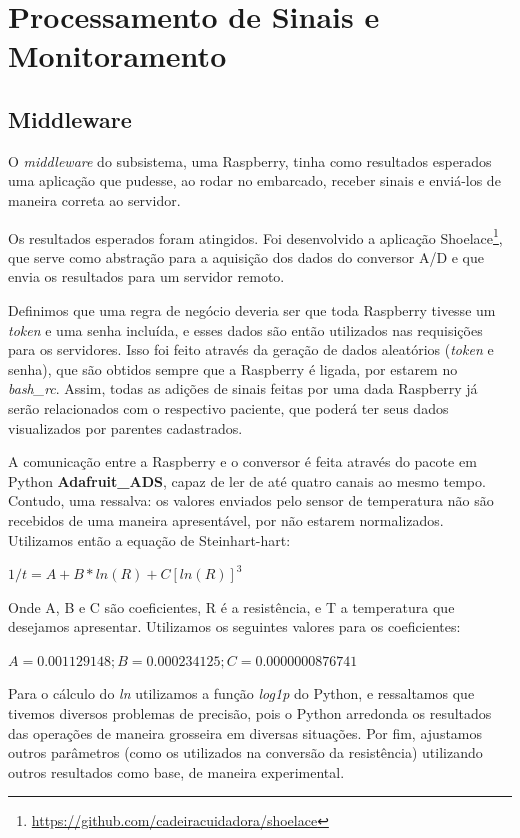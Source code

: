 \chapter{Processamento de Sinais e Monitoramento}

\section{Middleware}

O \textit{middleware} do subsistema, uma Raspberry, tinha como resultados
esperados uma aplicação que pudesse, ao rodar no embarcado, receber sinais e
enviá-los de maneira correta ao servidor.

Os resultados esperados foram atingidos. Foi desenvolvido a aplicação
Shoelace\footnote{\url{https://github.com/cadeiracuidadora/shoelace}}, que
serve como abstração para a aquisição dos dados do conversor A/D e que envia
os resultados para um servidor remoto.

Definimos que uma regra de negócio deveria ser que toda Raspberry tivesse
um \textit{token} e uma senha incluída, e esses dados são então utilizados nas
requisições para os servidores. Isso foi feito através da geração de dados
aleatórios (\textit{token} e senha), que são obtidos sempre que a Raspberry
é ligada, por estarem no \textit{bash\_rc}. Assim, todas as adições de sinais
feitas por uma dada Raspberry já serão relacionados com o respectivo paciente,
que poderá ter seus dados visualizados por parentes cadastrados.

A comunicação entre a Raspberry e o conversor é feita através do pacote em
Python \textbf{Adafruit\_ADS}, capaz de ler de até quatro canais ao mesmo tempo.
Contudo, uma ressalva: os valores enviados pelo sensor de temperatura não são
recebidos de uma maneira apresentável, por não estarem normalizados. Utilizamos
então a equação de Steinhart-hart:

$ 1/t = A + B * ln(R) + C[ln(R)]^3 $

Onde A, B e C são coeficientes, R é a resistência, e T a temperatura que
desejamos apresentar. Utilizamos os seguintes valores para os coeficientes:

$ A = 0.001129148; B = 0.000234125 ; C =  0.0000000876741 $

Para o cálculo do \textit{ln} utilizamos a função \textit{log1p} do Python, e
ressaltamos que tivemos diversos problemas de precisão, pois o Python arredonda
os resultados das operações de maneira grosseira em diversas situações. Por
fim, ajustamos outros parâmetros (como os utilizados na conversão da
resistência) utilizando outros resultados como base, de maneira experimental.

